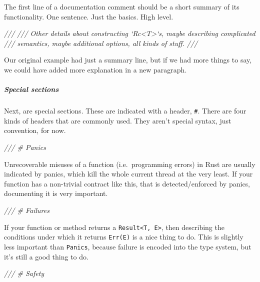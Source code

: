 \documentclass[a4paper,]{book}
\newenvironment{Shaded}{\begin{snugshade}}{\end{snugshade}}
\newcommand{\CommentTok}[1]{\textcolor[rgb]{0.56,0.35,0.01}{\textit{{#1}}}}
\let\oldsubparagraph\subparagraph
\renewcommand{\subparagraph}[1]{\oldsubparagraph{#1}\mbox{}}
\begin{document}
The first line of a documentation comment should be a short summary of
its functionality. One sentence. Just the basics. High level.

\begin{Shaded}
\begin{Highlighting}[]
\CommentTok{///}
\CommentTok{/// Other details about constructing `Rc<T>`s, maybe describing complicated}
\CommentTok{/// semantics, maybe additional options, all kinds of stuff.}
\CommentTok{///}
\end{Highlighting}
\end{Shaded}

Our original example had just a summary line, but if we had more things
to say, we could have added more explanation in a new paragraph.

\subparagraph{Special sections}\label{special-sections}

Next, are special sections. These are indicated with a header,
\texttt{\#}. There are four kinds of headers that are commonly used.
They aren't special syntax, just convention, for now.

\begin{Shaded}
\begin{Highlighting}[]
\CommentTok{/// # Panics}
\end{Highlighting}
\end{Shaded}

Unrecoverable misuses of a function (i.e.~programming errors) in Rust
are usually indicated by panics, which kill the whole current thread at
the very least. If your function has a non-trivial contract like this,
that is detected/enforced by panics, documenting it is very important.

\begin{Shaded}
\begin{Highlighting}[]
\CommentTok{/// # Failures}
\end{Highlighting}
\end{Shaded}

If your function or method returns a
\texttt{Result\textless{}T,\ E\textgreater{}}, then describing the
conditions under which it returns \texttt{Err(E)} is a nice thing to do.
This is slightly less important than \texttt{Panics}, because failure is
encoded into the type system, but it's still a good thing to do.

\begin{Shaded}
\begin{Highlighting}[]
\CommentTok{/// # Safety}
\end{Highlighting}
\end{Shaded}
\end{document}
